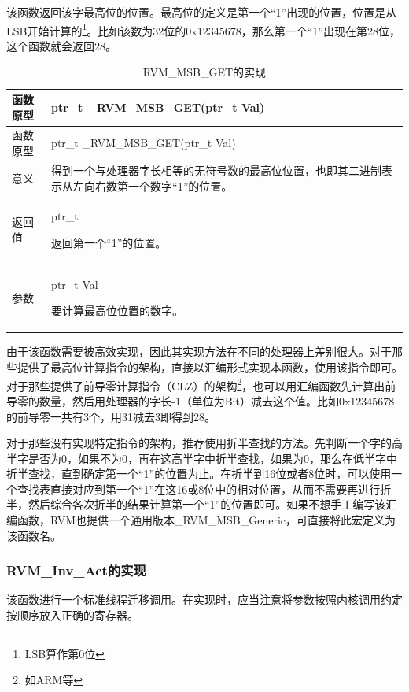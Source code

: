 该函数返回该字最高位的位置。最高位的定义是第一个``1''出现的位置，位置是从LSB开始计算的\footnote{LSB算作第0位}。比如该数为32位的0x12345678，那么第一个``1''出现在第28位，这个函数就会返回28。

\begin{xltabular}{\textwidth}{@{}>{\hsize\raggedright\arraybackslash}X>{\hsize\raggedright\arraybackslash}X@{}}
\caption{RVM\_\allowbreak{}MSB\_\allowbreak{}GET的实现}\label{tab:8-9}\\
\toprule
函数原型 & ptr\_\allowbreak{}t \_\allowbreak{}RVM\_\allowbreak{}MSB\_\allowbreak{}GET(ptr\_\allowbreak{}t Val)\tabularnewline
\endfirsthead
\toprule
函数原型 & ptr\_\allowbreak{}t \_\allowbreak{}RVM\_\allowbreak{}MSB\_\allowbreak{}GET(ptr\_\allowbreak{}t Val)\tabularnewline
\midrule
\endhead
\bottomrule
\endlastfoot
意义 &
得到一个与处理器字长相等的无符号数的最高位位置，也即其二进制表示从左向右数第一个数字``1''的位置。\tabularnewline
返回值\strut
 & ptr\_\allowbreak{}t

返回第一个``1''的位置。\strut
\tabularnewline
参数\strut
 & ptr\_\allowbreak{}t Val

要计算最高位位置的数字。\strut
\tabularnewline
\end{xltabular}

由于该函数需要被高效实现，因此其实现方法在不同的处理器上差别很大。对于那些提供了最高位计算指令的架构，直接以汇编形式实现本函数，使用该指令即可。对于那些提供了前导零计算指令（CLZ）的架构\footnote{如ARM等}，也可以用汇编函数先计算出前导零的数量，然后用处理器的字长-1（单位为Bit）减去这个值。比如0x12345678的前导零一共有3个，用31减去3即得到28。

对于那些没有实现特定指令的架构，推荐使用折半查找的方法。先判断一个字的高半字是否为0，如果不为0，再在这高半字中折半查找，如果为0，那么在低半字中折半查找，直到确定第一个``1''的位置为止。在折半到16位或者8位时，可以使用一个查找表直接对应到第一个``1''在这16或8位中的相对位置，从而不需要再进行折半，然后综合各次折半的结果计算第一个``1''的位置即可。如果不想手工编写该汇编函数，RVM也提供一个通用版本\_RVM\_MSB\_Generic，可直接将此宏定义为该函数名。

\subsubsection{RVM\_Inv\_Act的实现}\label{subsubsec:8-2-6-4}

该函数进行一个标准线程迁移调用。在实现时，应当注意将参数按照内核调用约定按顺序放入正确的寄存器。

